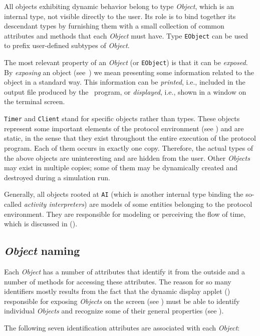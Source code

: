 All objects exhibiting dynamic behavior belong to type {\em Object}, which
is an internal type, not visible directly to the user.
Its role is to bind together its descendant types by furnishing them with a
small collection of common attributes and methods that each
{\em Object\/} must have.
Type {\tt EObject} can be used to prefix user-defined subtypes of {\em Object}.

The most relevant property of
an {\em Object\/} (or {\tt EObject}) is that it can be
{\em exposed}.
By {\em exposing\/} an object (see~) we mean presenting some
information related to the object in a standard way.
This information can be {\em printed}, i.e.,
included in the output file produced by the \smurph\ program,
or {\em displayed},
i.e., shown in a window on the terminal screen.

{\tt Timer} and {\tt Client} stand for specific objects rather than types.
These objects represent some important elements of the protocol environment
(see )
and are static, in the sense that they exist throughout the entire execution
of the protocol program.
Each of them occurs in exactly one copy.
Therefore,
the actual types of the above objects are uninteresting and are hidden from
the user.
Other {\em Objects\/} may exist in multiple copies; some of them may be
dynamically created and destroyed during a simulation run.

Generally, all objects rooted at {\tt AI\/} (which is another internal type
binding the so-called {\em activity interpreters\/})
are models of some entities belonging to the protocol environment.
They are responsible for modeling or perceiving
the flow of time, which is discussed in ().

\subsection{{\em Object\/} naming}
\label{rm_st_on}

Each {\em Object\/} has a number of attributes that identify it from the outside
and a number of methods for accessing these attributes.
The reason for so many identifiers mostly results from the fact that the
dynamic display applet (\dsd)
responsible for exposing {\em Objects\/} on the screen (see
) must be
able to identify individual {\em Objects\/} and recognize some of their
general properties (see ).

The following seven identification attributes are associated with each
{\em Object\/}:

